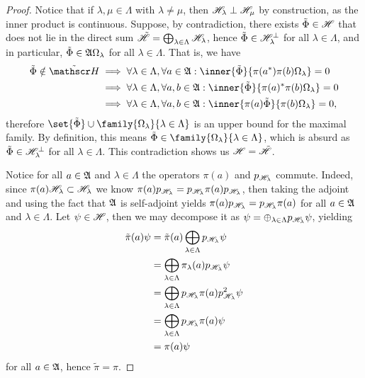 \begin{proof}
    Notice that if \(\lambda, \mu \in \Lambda\) with \(\lambda \neq \mu\), then \(\mathscr{H}_{\lambda} \perp \mathscr{H}_{\mu}\) by construction, as the inner product is continuous. Suppose, by contradiction, there exists \(\tilde{\Phi} \in \mathscr{H}\) that does not lie in the direct sum \(\tilde{\mathscr{H}} = \bigoplus_{\lambda \in \Lambda} \mathscr{H}_\lambda\), hence \(\tilde{\Phi} \in \mathscr{H}_\lambda^\perp\) for all \(\lambda \in \Lambda\), and in particular, \(\tilde{\Phi} \in \mathfrak{A}\Omega_{\lambda}\) for all \(\lambda \in \Lambda\). That is, we have
    \begin{align*}
        \tilde{\Phi} \notin \tilde{\hilbert} &\implies \forall \lambda \in \Lambda, \forall a \in \algebra{A} : \inner{\tilde{\Phi}}{\pi(a^{\ast})\pi(b)\Omega_\lambda} = 0\\
                                             &\implies \forall \lambda \in \Lambda, \forall a,b\in \algebra{A} : \inner{\tilde{\Phi}}{\pi(a)^{\ast}\pi(b)\Omega_{\lambda}} = 0\\
                                             &\implies \forall \lambda \in \Lambda, \forall a,b \in \algebra{A}: \inner{\pi(a)\tilde{\Phi}}{\pi(b)\Omega_\lambda} = 0,
    \end{align*}
    therefore \(\set{\tilde{\Phi}}\cup \family{\Omega_\lambda}{\lambda \in \Lambda}\) is an upper bound for the maximal family. By definition, this means \(\tilde{\Phi} \in \family{\Omega_\lambda}{\lambda \in \Lambda}\), which is absurd as \(\tilde{\Phi} \in \mathscr{H}_{\lambda}^\perp\) for all \(\lambda \in \Lambda\). This contradiction shows us \(\mathscr{H} = \tilde{\mathscr{H}}\).

    Notice for all \(a \in \mathfrak{A}\) and \(\lambda \in \Lambda\) the operators \(\pi(a)\) and \(p_{\mathscr{H}_\lambda}\) commute. Indeed, since \(\pi(a) \mathscr{H}_\lambda \subset \mathscr{H}_\lambda\) we know \(\pi(a)p_{\mathscr{H}_\lambda} = p_{\mathscr{H}_\lambda}\pi(a)p_{\mathscr{H}_\lambda}\), then taking the adjoint and using the fact that \(\mathfrak{A}\) is self-adjoint yields \(\pi(a)p_{\mathscr{H}_\lambda} = p_{\mathscr{H}_\lambda}\pi(a)\) for all \(a \in \mathfrak{A}\) and \(\lambda \in \Lambda\). Let \(\psi \in \mathscr{H}\), then we may decompose it as \(\psi = \oplus_{\lambda \in \Lambda}p_{\mathscr{H}_\lambda}\psi\), yielding
    \begin{align*}
        \tilde{\pi}(a)\psi &= \tilde{\pi}(a)\bigoplus_{\lambda \in \Lambda} p_{\mathscr{H}_\lambda}\psi\\
                           &= \bigoplus_{\lambda \in \Lambda} \pi_{\lambda}(a) p_{\mathscr{H}_\lambda}\psi\\
                           &= \bigoplus_{\lambda \in \Lambda} p_{\mathscr{H}_\lambda} \pi(a) p_{\mathscr{H}_\lambda}^2 \psi\\
                           &= \bigoplus_{\lambda \in \Lambda} p_{\mathscr{H}_\lambda} \pi(a) \psi\\
                           &= \pi(a) \psi
    \end{align*}
    for all \(a \in \mathfrak{A}\), hence \(\tilde{\pi} = \pi\).
\end{proof}

